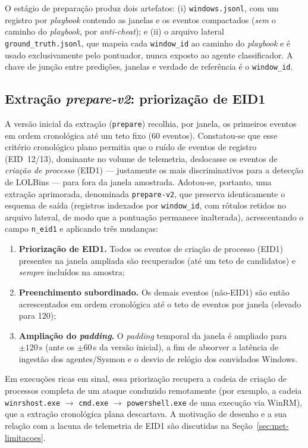 O estágio de preparação produz dois artefatos: (i) \texttt{windows.jsonl}, com um
registro por \textit{playbook} contendo as janelas e os eventos compactados
(\emph{sem} o caminho do \textit{playbook}, por \textit{anti-cheat}); e (ii) o
arquivo lateral \texttt{ground\_truth.jsonl}, que mapeia cada \texttt{window\_id}
ao caminho do \textit{playbook} e é usado exclusivamente pelo pontuador, nunca
exposto ao agente classificador. A chave de junção entre predições, janelas e
verdade de referência é o \texttt{window\_id}.

\subsection{Extração \textit{prepare-v2}: priorização de EID1}
\label{subsec:prepare-v2}

A versão inicial da extração (\texttt{prepare}) recolhia, por janela, os
primeiros eventos em ordem cronológica até um teto fixo (60 eventos). Constatou-se
que esse critério cronológico plano permitia que o ruído de eventos de registro
(EID~12/13), dominante no volume de telemetria, deslocasse os eventos de
\emph{criação de processo} (EID1) --- justamente os mais discriminativos para a
detecção de LOLBins --- para fora da janela amostrada. Adotou-se, portanto, uma
extração aprimorada, denominada \texttt{prepare-v2}, que preserva
identicamente o esquema de saída (registros indexados por \texttt{window\_id},
com rótulos retidos no arquivo lateral, de modo que a pontuação permanece
inalterada), acrescentando o campo \texttt{n\_eid1} e aplicando três mudanças:

\begin{enumerate}
    \item \textbf{Priorização de EID1.} Todos os eventos de criação de processo
    (EID1) presentes na janela ampliada são recuperados (até um teto de
    candidatos) e \emph{sempre} incluídos na amostra;
    \item \textbf{Preenchimento subordinado.} Os demais eventos (não-EID1) são
    então acrescentados em ordem cronológica até o teto de eventos por janela
    (elevado para 120);
    \item \textbf{Ampliação do \textit{padding}.} O \textit{padding} temporal da
    janela é ampliado para $\pm120$\,s (ante os $\pm60$\,s da versão inicial), a
    fim de absorver a latência de ingestão dos agentes/Sysmon e o desvio de
    relógio dos convidados Windows.
\end{enumerate}

Em execuções ricas em sinal, essa priorização recupera a cadeia de criação de
processos completa de um ataque conduzido remotamente (por exemplo, a cadeia
\texttt{winrshost.exe} $\rightarrow$ \texttt{cmd.exe} $\rightarrow$
\texttt{powershell.exe} de uma execução via WinRM), que a extração cronológica
plana descartava. A motivação de desenho e a sua relação com a lacuna de
telemetria de EID1 são discutidas na Seção~\ref{sec:met-limitacoes}.

